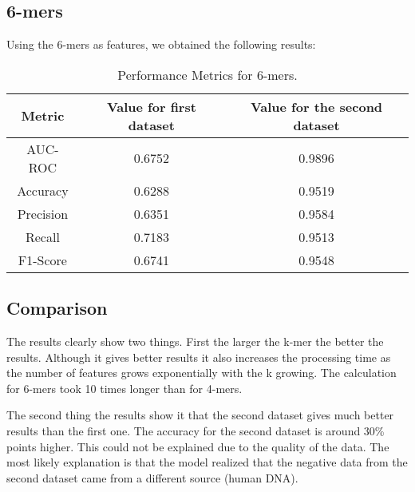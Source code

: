 \subsection{6-mers}
Using the 6-mers as features, we obtained the following results:
\begin{table}[ht]
\centering
\begin{tabular}{|c|c|c|}
  \hline
  \textbf{Metric} & \textbf{Value for first dataset} & \textbf{Value for the second dataset} \\
  \hline
AUC-ROC   & 0.6752 & 0.9896 \\
Accuracy  & 0.6288 & 0.9519 \\
Precision & 0.6351 & 0.9584 \\
Recall    & 0.7183 & 0.9513 \\
F1-Score  & 0.6741 & 0.9548 \\
  \hline
\end{tabular}
\caption{Performance Metrics for 6-mers.}
\end{table}

\subsection{Comparison}
The results clearly show two things. 
First the larger the k-mer the better the results. 
Although it gives better results it also increases the processing time as the number of features grows exponentially with the k growing. 
The calculation for 6-mers took 10 times longer than for 4-mers.

The second thing the results show it that the second dataset gives much better results than the first one.
The accuracy for the second dataset is around 30\% points higher.
This could not be explained due to the quality of the data.
The most likely explanation is that the model realized that the negative data from the second dataset came from a different source (human DNA).


